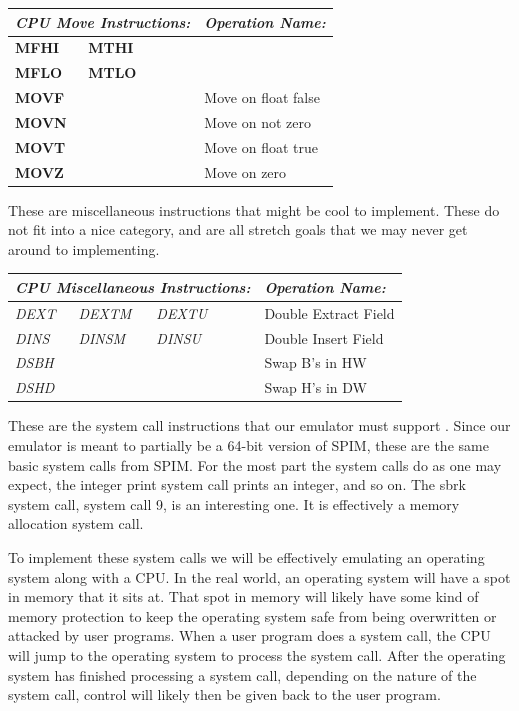 \documentclass[
    parskip=half,
    fontsize=12pt,
    titlepage=firstiscover,
    toc=bibliography,
    numbers=endperiod
]{scrartcl}
\begin{document}
\begin{tabularx}{\textwidth}{@{}lllll|X@{}}
    \multicolumn{5}{l|}{\emph{CPU Move Instructions:}} & \emph{Operation Name:} \\\hline
    \textbf{MFHI} & \textbf{MTHI} & & &                & \\
    \textbf{MFLO} & \textbf{MTLO} & & &                & \\
    \textbf{MOVF} & & & &                              & Move on float false \\
    \textbf{MOVN} & & & &                              & Move on not zero \\
    \textbf{MOVT} & & & &                              & Move on float true \\
    \textbf{MOVZ} & & & &                              & Move on zero \\
\end{tabularx}

These are miscellaneous instructions that might be cool to implement.
These do not fit into a nice category, and are all stretch goals that we
may never get around to implementing.

\begin{tabularx}{\textwidth}{@{}lllll|X@{}}
    \multicolumn{5}{l|}{\emph{CPU Miscellaneous Instructions:}} & \emph{Operation Name:} \\\hline
    \emph{DEXT} & \emph{DEXTM} & \emph{DEXTU} & &               & Double Extract Field \\
    \emph{DINS} & \emph{DINSM} & \emph{DINSU} & &               & Double Insert Field \\
    \emph{DSBH} & & & &                                         & Swap B's in HW \\
    \emph{DSHD} & & & &                                         & Swap H's in DW \\
\end{tabularx}

These are the system call instructions that our emulator must support \cite{spim-system-calls}.
Since our emulator is meant to partially be a 64-bit version of SPIM,
these are the same basic system calls from SPIM. For the most part the
system calls do as one may expect, the integer print system call prints
an integer, and so on. The sbrk system call, system call 9, is an
interesting one. It is effectively a memory allocation system call.

To implement these system calls we will be effectively emulating an
operating system along with a CPU. In the real world, an operating
system will have a spot in memory that it sits at. That spot in memory
will likely have some kind of memory protection to keep the operating
system safe from being overwritten or attacked by user programs. When a
user program does a system call, the CPU will jump to the operating
system to process the system call. After the operating system has
finished processing a system call, depending on the nature of the system
call, control will likely then be given back to the user program.
\end{document}
